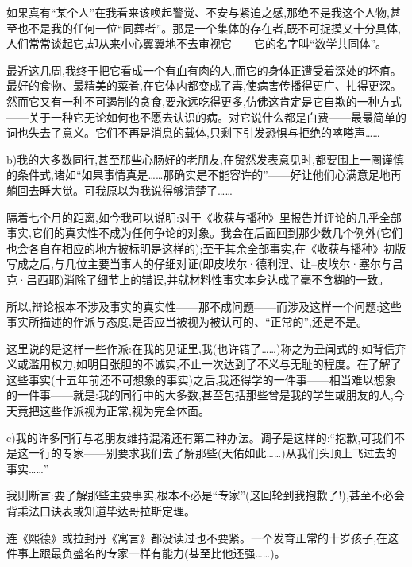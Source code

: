 如果真有“某个人”在我看来该唤起警觉、不安与紧迫之感,那绝不是我这个人物,甚至也不是我的任何一位“同葬者”。那是一个集体的存在者,既不可捉摸又十分具体,人们常常谈起它,却从来小心翼翼地不去审视它——它的名字叫“数学共同体”。

最近这几周,我终于把它看成一个有血有肉的人,而它的身体正遭受着深处的坏疽。最好的食物、最精美的菜肴,在它体内都变成了毒,使病害传播得更广、扎得更深。然而它又有一种不可遏制的贪食,要永远吃得更多,仿佛这肯定是它自欺的一种方式——关于一种它无论如何也不愿去认识的病。对它说什么都是白费——最最简单的词也失去了意义。它们不再是消息的载体,只剩下引发恐惧与拒绝的喀嗒声……

b)我的大多数同行,甚至那些心肠好的老朋友,在贸然发表意见时,都要围上一圈谨慎的条件式,诸如“如果事情真是……那确实是不能容许的”——好让他们心满意足地再躺回去睡大觉。可我原以为我说得够清楚了……

隔着七个月的距离,如今我可以说明:对于《收获与播种》里报告并评论的几乎全部事实,它们的真实性不成为任何争论的对象。我会在后面回到那少数几个例外(它们也会各自在相应的地方被标明是这样的);至于其余全部事实,在《收获与播种》初版写成之后,与几位主要当事人的仔细对证(即皮埃尔·德利涅、让–皮埃尔·塞尔与吕克·吕西耶)消除了细节上的错误,并就材料性事实本身达成了毫不含糊的一致。

所以,辩论根本不涉及事实的真实性——那不成问题——而涉及这样一个问题:这些事实所描述的作派与态度,是否应当被视为被认可的、“正常的”,还是不是。

这里说的是这样一些作派:在我的见证里,我(也许错了……)称之为丑闻式的;如背信弃义或滥用权力,如明目张胆的不诚实,不止一次达到了不义与无耻的程度。在了解了这些事实(十五年前还不可想象的事实)之后,我还得学的一件事——相当难以想象的一件事——就是:我的同行中的大多数,甚至包括那些曾是我的学生或朋友的人,今天竟把这些作派视为正常,视为完全体面。

c)我的许多同行与老朋友维持混淆还有第二种办法。调子是这样的:“抱歉,可我们不是这一行的专家——别要求我们去了解那些(天佑如此……)从我们头顶上飞过去的事实……”

我则断言:要了解那些主要事实,根本不必是“专家”(这回轮到我抱歉了!),甚至不必会背乘法口诀表或知道毕达哥拉斯定理。

连《熙德》或拉封丹《寓言》都没读过也不要紧。一个发育正常的十岁孩子,在这件事上跟最负盛名的专家一样有能力(甚至比他还强……)。

